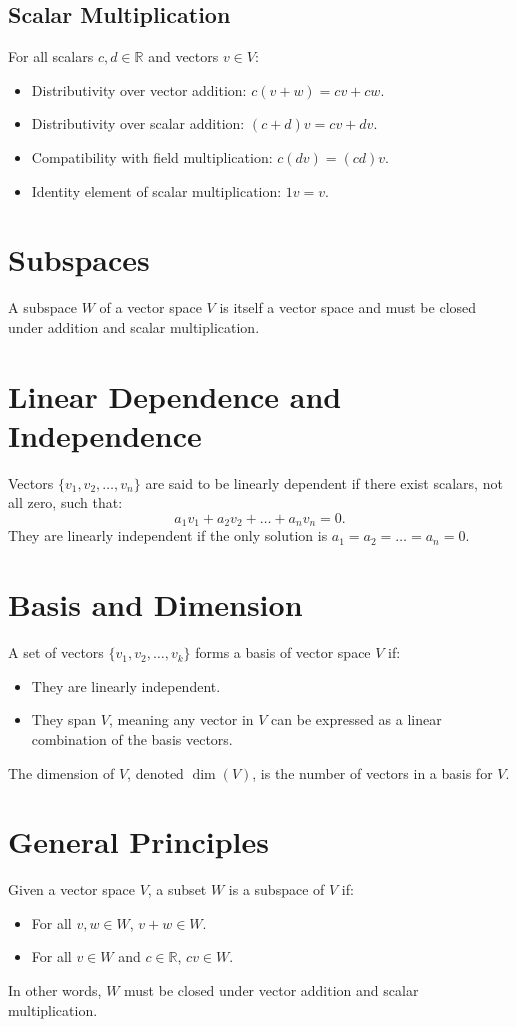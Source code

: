 \documentclass{article}
\begin{document}
\subsection*{Scalar Multiplication}
For all scalars $c, d \in \mathbb{R}$ and vectors $v \in V$:
\begin{itemize}
    \item Distributivity over vector addition: $c(v + w) = cv + cw$.
    \item Distributivity over scalar addition: $(c + d)v = cv + dv$.
    \item Compatibility with field multiplication: $c(dv) = (cd)v$.
    \item Identity element of scalar multiplication: $1v = v$.
\end{itemize}

\section*{Subspaces}
A subspace $W$ of a vector space $V$ is itself a vector space and must be closed under addition and scalar multiplication.

\section*{Linear Dependence and Independence}
Vectors $\{v_1, v_2, \ldots, v_n\}$ are said to be linearly dependent if there exist scalars, not all zero, such that:
\begin{equation*}
    a_1v_1 + a_2v_2 + \ldots + a_nv_n = 0.
\end{equation*}
They are linearly independent if the only solution is $a_1 = a_2 = \ldots = a_n = 0$.

\section*{Basis and Dimension}
A set of vectors $\{v_1, v_2, \ldots, v_k\}$ forms a basis of vector space $V$ if:
\begin{itemize}
    \item They are linearly independent.
    \item They span $V$, meaning any vector in $V$ can be expressed as a linear combination of the basis vectors.
\end{itemize}
The dimension of $V$, denoted $\dim(V)$, is the number of vectors in a basis for $V$.

\section*{General Principles}
Given a vector space $V$, a subset $W$ is a subspace of $V$ if:
\begin{itemize}
    \item For all $v, w \in W$, $v + w \in W$.
    \item For all $v \in W$ and $c \in \mathbb{R}$, $cv \in W$.
\end{itemize}
In other words, $W$ must be closed under vector addition and scalar multiplication.
\end{document}
